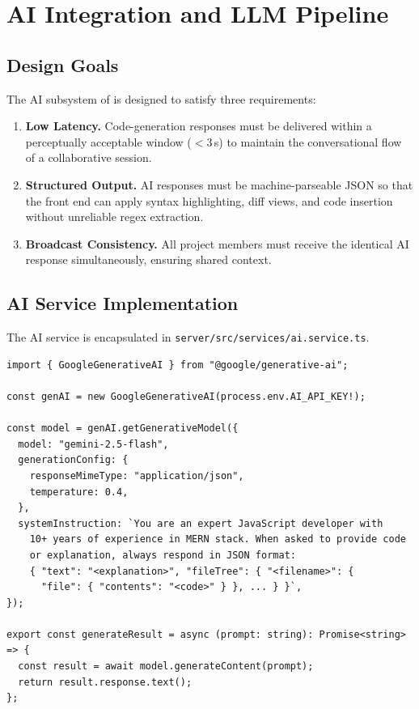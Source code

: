 \section{AI Integration and LLM Pipeline}
\label{sec:ai}

\subsection{Design Goals}

The AI subsystem of \echoray{} is designed to satisfy three requirements:

\begin{enumerate}[leftmargin=*, label=\textbf{R\arabic*.}]
  \item \textbf{Low Latency.} Code-generation responses must be delivered
    within a perceptually acceptable window ($<$3\,s) to maintain the
    conversational flow of a collaborative session.
  \item \textbf{Structured Output.} AI responses must be machine-parseable
    JSON so that the front end can apply syntax highlighting, diff views, and
    code insertion without unreliable regex extraction.
  \item \textbf{Broadcast Consistency.} All project members must receive the
    identical AI response simultaneously, ensuring shared context.
\end{enumerate}

\subsection{AI Service Implementation}

The AI service is encapsulated in \texttt{server/src/services/ai.service.ts}.

\begin{lstlisting}[caption={AI service---Gemini configuration and query method
  (\texttt{ai.service.ts}).}, label=lst:aiservice]
import { GoogleGenerativeAI } from "@google/generative-ai";

const genAI = new GoogleGenerativeAI(process.env.AI_API_KEY!);

const model = genAI.getGenerativeModel({
  model: "gemini-2.5-flash",
  generationConfig: {
    responseMimeType: "application/json",
    temperature: 0.4,
  },
  systemInstruction: `You are an expert JavaScript developer with
    10+ years of experience in MERN stack. When asked to provide code
    or explanation, always respond in JSON format:
    { "text": "<explanation>", "fileTree": { "<filename>": {
      "file": { "contents": "<code>" } }, ... } }`,
});

export const generateResult = async (prompt: string): Promise<string> => {
  const result = await model.generateContent(prompt);
  return result.response.text();
};
\end{lstlisting}


